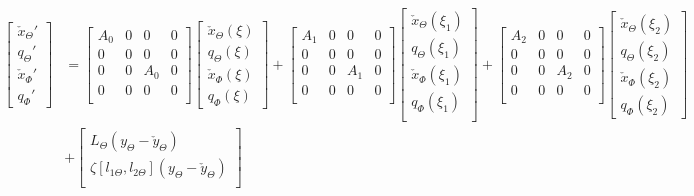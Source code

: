 \documentclass[main.tex]{subfiles}
\begin{document}
	\begin{align}
	\begin{bmatrix}
	\check{x}_\Theta' \\
	q_\Theta' \\
	\check{x}_\Phi'\\
	q_\Phi'
	\end{bmatrix} &=
	\begin{bmatrix}
	A_0 & 0 & 0 & 0\\
	0 & 0 & 0 & 0\\
	0 & 0 & A_0 & 0 \\
	0 & 0 & 0 & 0 \\
	\end{bmatrix}
	\begin{bmatrix}
	\check{x}_\Theta(\xi) \\
	q_\Theta(\xi) \\
	\check{x}_\Phi(\xi) \\
	q_\Phi (\xi)
	\end{bmatrix} + 
	\begin{bmatrix}
	A_1 & 0 & 0 & 0\\
	0 & 0 & 0 & 0\\
	0 & 0 & A_1 & 0 \\
	0 & 0 & 0 & 0 \\
	\end{bmatrix}
	\begin{bmatrix}
	\check{x}_\Theta(\xi_1) \\
	q_\Theta(\xi_1) \\
	\check{x}_\Phi(\xi_1) \\
	q_\Phi(\xi_1) \\
	\end{bmatrix} +
	\begin{bmatrix}
	A_2 & 0 & 0 & 0\\
	0 & 0 & 0 & 0\\
	0 & 0 & A_2 & 0 \\
	0 & 0 & 0 & 0 \\
	\end{bmatrix}
	\begin{bmatrix}
	\check{x}_\Theta(\xi_2) \\
	q_\Theta(\xi_2) \\
	\check{x}_\Phi(\xi_2) \\
	q_\Phi(\xi_2) 
	\end{bmatrix} \nonumber\\
	&+
	\begin{bmatrix}
	L_\Theta(y_{\Theta} - \check{y}_{\Theta})\\
	\zeta[l_{1\Theta},l_{2\Theta}](y_\Theta - \check{y}_\Theta) \\

\end{bmatrix}
\end{align}
\end{document}
